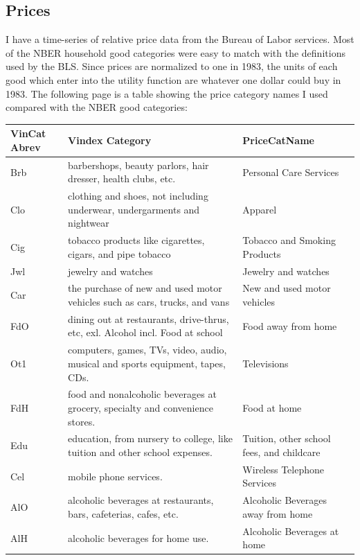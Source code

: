 \documentclass[12pt]{article}
\begin{document}
\subsection{Prices}
I have a time-series of relative price data from the Bureau of Labor services.
Most of the NBER household good categories were easy to match with the definitions used by the BLS.   
Since prices are normalized to one in 1983, the units of each good which enter into the utility function are whatever one dollar could buy in 1983.
The following page is a table showing the price category names I used compared with the NBER good categories:
    \begin{table}
	\footnotesize
	\centering
\begin{sideways}
\begin{tabular}{|l|l|l|}
\hline
VinCat Abrev & Vindex Category & PriceCatName\\ 
\hline
Brb & barbershops, beauty parlors, hair dresser, health clubs, etc. & Personal Care Services\\ 
\hline
Clo & clothing and shoes, not including underwear, undergarments and nightwear & Apparel\\ 
\hline
Cig & tobacco products like cigarettes, cigars, and pipe tobacco & Tobacco and Smoking Products\\ 
\hline
Jwl & jewelry and watches & Jewelry and watches\\ 
\hline
Car & the purchase of new and used motor vehicles such as cars, trucks, and vans & New and used motor vehicles\\ 
\hline
FdO & dining out at restaurants, drive-thrus, etc, exl. Alcohol incl. Food at school & Food away from home\\ 
\hline
Ot1 & computers, games, TVs, video, audio, musical and sports equipment, tapes, CDs. & Televisions\\ 
\hline
FdH & food and nonalcoholic beverages at grocery, specialty and convenience stores. & Food at home\\ 
\hline
Edu & education, from nursery to college, like tuition and other school expenses. & Tuition, other school fees, and childcare\\ 
\hline
Cel & mobile phone services. & Wireless Telephone Services\\ 
\hline
AlO & alcoholic beverages at restaurants, bars, cafeterias, cafes, etc. & Alcoholic Beverages away from home\\ 
\hline
AlH & alcoholic beverages for home use. & Alcoholic Beverages at home\\ 

\end{tabular}
\end{sideways}
\end{table}
\end{document}
